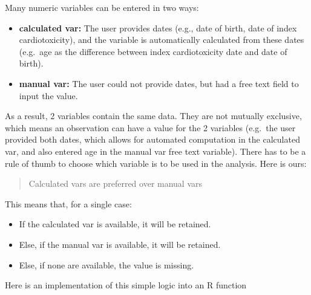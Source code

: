 \documentclass[
]{book}
\begin{document}
Many numeric variables can be entered in two ways:

\begin{itemize}
\item
  \textbf{calculated var:} The user provides dates (e.g., date of birth,
  date of index cardiotoxicity), and the variable is automatically
  calculated from these dates (e.g.~age as the difference between
  index cardiotoxicity date and date of birth).
\item
  \textbf{manual var:} The user could not provide dates, but had a free
  text field to input the value.
\end{itemize}

As a result, 2 variables contain the same data. They are not mutually
exclusive, which means an observation can have a value for the 2
variables (e.g.~the user provided both dates, which allows for automated
computation in the calculated var, and also entered age in the manual
var free text variable). There has to be a rule of thumb to choose which
variable is to be used in the analysis. Here is ours:

\begin{quote}
Calculated vars are preferred over manual vars
\end{quote}

This means that, for a single case:

\begin{itemize}
\item
  If the calculated var is available, it will be retained.
\item
  Else, if the manual var is available, it will be retained.
\item
  Else, if none are available, the value is missing.
\end{itemize}

Here is an implementation of this simple logic into an R function
\end{document}

